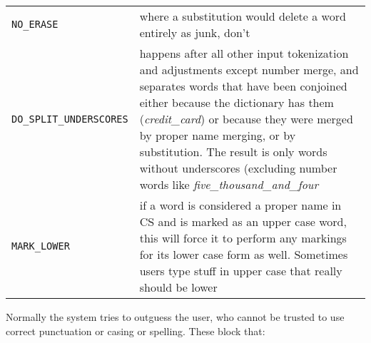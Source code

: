 \documentclass[]{article}
\begin{document}
\begin{longtable}[]{@{}ll@{}}
\begin{minipage}[t]{0.28\columnwidth}
\texttt{NO\_ERASE}\strut
\end{minipage} & \begin{minipage}[t]{0.67\columnwidth}\raggedright\strut
where a substitution would delete a word entirely as junk, don't\strut
\end{minipage}\tabularnewline
\begin{minipage}[t]{0.28\columnwidth}\raggedright\strut
\texttt{DO\_SPLIT\_UNDERSCORES}\strut
\end{minipage} & \begin{minipage}[t]{0.67\columnwidth}\raggedright\strut
happens after all other input tokenization and adjustments except number
merge, and separates words that have been conjoined either because the
dictionary has them (\emph{credit\_card}) or because they were merged by
proper name merging, or by substitution. The result is only words
without underscores (excluding number words like
\emph{five\_thousand\_and\_four}\strut
\end{minipage}\tabularnewline
\begin{minipage}[t]{0.28\columnwidth}\raggedright\strut
\texttt{MARK\_LOWER}\strut
\end{minipage} & \begin{minipage}[t]{0.67\columnwidth}\raggedright\strut
if a word is considered a proper name in CS and is marked as an upper
case word, this will force it to perform any markings for its lower case
form as well. Sometimes users type stuff in upper case that really
should be lower\strut
\end{minipage}\tabularnewline
\bottomrule
\end{longtable}

Normally the system tries to outguess the user, who cannot be trusted to
use correct punctuation or casing or spelling. These block that:
\end{document}
